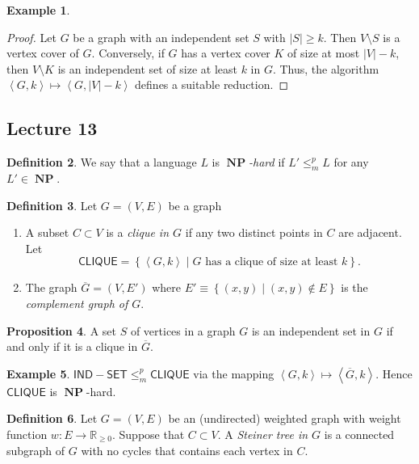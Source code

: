 \documentclass[10pt,letterpaper,cm]{nupset}
\theoremstyle{definition}
\newtheorem{definition}{Definition}[subsection]
\newtheorem{exmp}[definition]{Example}
\theoremstyle{theorem}
\newtheorem{prop}[definition]{Proposition}
\theoremstyle{remark}
\newcommand{\R}{\mathbb R}
\newcommand{\1}{\mathbf{1}}
\newcommand{\0}{\vec 0}
\DeclareMathOperator{\NP}{\mathbf{NP}}
\begin{document}
\begin{exmp}
\begin{enumerate}
\begin{proof}
Let $G$ be a graph with an independent set $S$ with $\left\lvert{S}\right\rvert\geq k$.  Then $V \setminus S$ is a vertex cover of $G$. Conversely, if $G$ has a vertex cover $K$ of size at most $\left\lvert{V}\right\rvert - k$, then $V \setminus K$ is an independent set of size at least $k$ in $G$. Thus, the algorithm $\left\langle G, k \right\rangle \mapsto \left\langle G, \left\lvert{V}\right\rvert - k\right\rangle$ defines a suitable reduction.  
\end{proof}
\end{enumerate}
\end{exmp}

\subsection{Lecture 13}

\begin{definition}
We say that a language $L$ is \textit{$\NP$-hard} if $L' \leq_m^p L$ for any $L' \in \NP$.
\end{definition}

\begin{definition} Let $G=\left(V, E\right)$ be a graph
\begin{enumerate}
\item A subset $C \subset V$ is a \textit{clique in $G$} if any two distinct points in $C$ are adjacent. Let $$\mathsf{CLIQUE}= \left\{\left\langle G, k \right\rangle \mid G \text{ has a clique of size at least }k\right\}.$$
\item The graph $\overline{G} = \left(V, E'\right)$ where $E' \equiv \left\{\left(x,y\right) \mid \left(x,y\right) \notin E\right\}$ is the  \textit{complement graph of $G$}.
\end{enumerate}
\end{definition}

\begin{prop}
 A set $S$ of vertices in a graph $G$ is an independent set in $G$ if and only if it is a clique in $\overline{G}$.
\end{prop}

\begin{exmp}
$\mathsf{IND{-}SET} \leq_m^p \mathsf{CLIQUE}$ via the mapping $\left\langle G, k \right\rangle \mapsto \left\langle \overline{G}, k \right\rangle$. Hence $\mathsf{CLIQUE}$ is $\NP$-hard.
\end{exmp}

\begin{definition}
Let $G= \left(V, E\right)$ be an (undirected) weighted graph with weight function $w : E \to \R_{\geq 0}$. Suppose that $C \subset V$. A \textit{Steiner tree in $G$} is a connected subgraph of $G$ with no cycles that contains each vertex in $C$.
\end{definition}
\end{document}
